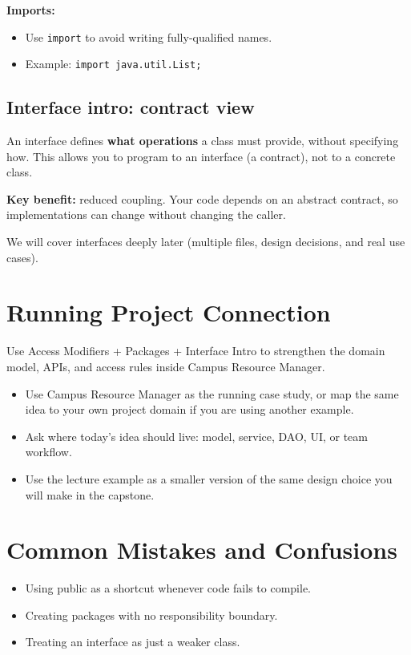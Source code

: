 \documentclass[11pt]{article}
\begin{document}
\textbf{Imports:}
\begin{itemize}
  \item Use \texttt{import} to avoid writing fully-qualified names.
  \item Example: \texttt{import java.util.List;}
\end{itemize}

\subsection{Interface intro: contract view}
An interface defines \textbf{what operations} a class must provide, without specifying how.
This allows you to program to an interface (a contract), not to a concrete class.

\textbf{Key benefit:} reduced coupling. Your code depends on an abstract contract, so implementations can change without changing the caller.

We will cover interfaces deeply later (multiple files, design decisions, and real use cases).
\notesources{\OOPSUnitIISources}

\section{Running Project Connection}
Use Access Modifiers + Packages + Interface Intro to strengthen the domain model, APIs, and access rules inside Campus Resource Manager.
\begin{itemize}
  \item Use Campus Resource Manager as the running case study, or map the same idea to your own project domain if you are using another example.
  \item Ask where today's idea should live: model, service, DAO, UI, or team workflow.
  \item Use the lecture example as a smaller version of the same design choice you will make in the capstone.
\end{itemize}
\notesources{\OOPSUnitIISources}

\section{Common Mistakes and Confusions}
\begin{itemize}
  \item Using public as a shortcut whenever code fails to compile.
  \item Creating packages with no responsibility boundary.
  \item Treating an interface as just a weaker class.
\end{itemize}
\notesources{\OOPSUnitIISources}
\end{document}
